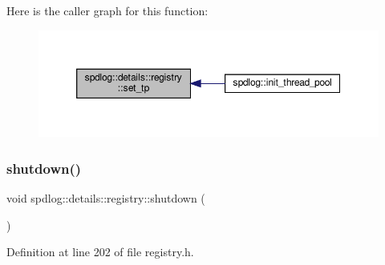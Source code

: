 Here is the caller graph for this function\+:
\nopagebreak
\begin{figure}[H]
\begin{center}
\leavevmode
\includegraphics[width=350pt]{classspdlog_1_1details_1_1registry_aa5503db04a70a06f97e7c1218aa8cbe2_icgraph}
\end{center}
\end{figure}
\mbox{\label{classspdlog_1_1details_1_1registry_ac93f888f316b0488414771ad6533b6a9}} 
\subsubsection{\texorpdfstring{shutdown()}{shutdown()}}
{\footnotesize\ttfamily void spdlog\+::details\+::registry\+::shutdown (\begin{DoxyParamCaption}{ }\end{DoxyParamCaption})\hspace{0.3cm}{\ttfamily [inline]}}



Definition at line 202 of file registry.\+h.

